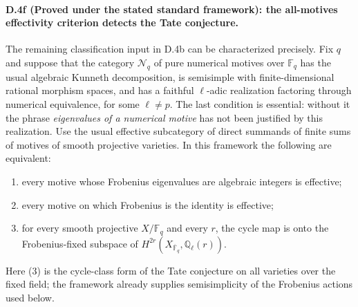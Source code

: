 \paragraph{D.4f (Proved under the stated standard framework): the all-motives effectivity criterion detects the Tate conjecture.}
The remaining classification input in D.4b can be characterized
precisely. Fix $q$ and suppose that the category $\mathcal N_q$ of
pure numerical motives over $\mathbb F_q$ has the usual algebraic
Kunneth decomposition, is semisimple with finite-dimensional
rational morphism spaces, and has a faithful $\ell$-adic
realization factoring through numerical equivalence, for some
$\ell\ne p$. The last condition is essential: without it the
phrase \emph{eigenvalues of a numerical motive} has not been
justified by this realization.
Use the usual effective subcategory of direct summands of finite
sums of motives of smooth projective varieties. In this framework
the following are equivalent:
\begin{enumerate}
\item every motive whose Frobenius eigenvalues are algebraic
integers is effective;
\item every motive on which Frobenius is the identity is effective;
\item for every smooth projective $X/\mathbb F_q$ and every $r$,
the cycle map is onto the Frobenius-fixed subspace of
$H^{2r}(X_{\overline{\mathbb F}_q},\mathbb Q_\ell(r))$.
\end{enumerate}
Here (3) is the cycle-class form of the Tate conjecture on all
varieties over the fixed field; the framework already supplies
semisimplicity of the Frobenius actions used below.


